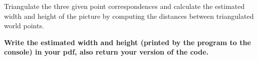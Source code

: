 \documentclass[12pt]{article} %
\newenvironment{exercise}[2][Task]{\begin{trivlist}
\item[\hskip \labelsep {\bfseries #1}\hskip \labelsep {\bfseries #2.}]}{\end{trivlist}}
\begin{document}
\begin{exercise}{3}
\noindent Triangulate the three given point correspondences and calculate the estimated width and height of the picture by computing the distances between triangulated world points.


\noindent \textbf{Write the estimated width and height (printed by the program to the console) in your pdf, also return your version of the code.}
\end{exercise}
\end{document}
